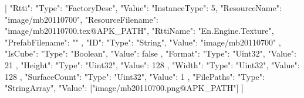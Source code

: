 [{
        "Rtti": {
            "Type": "FactoryDesc",
            "Value": {
                "InstanceType": 5,
                "ResourceName": "image/mb20110700",
                "ResourceFilename": "image/mb20110700.tex@APK_PATH",
                "RttiName": "En.Engine.Texture",
                "PrefabFilename": ""
            }
        },
        "ID": {
            "Type": "String",
            "Value": "image/mb20110700"
        },
        "IsCube": {
            "Type": "Boolean",
            "Value": false
        },
        "Format": {
            "Type": "Uint32",
            "Value": 21
        },
        "Height": {
            "Type": "Uint32",
            "Value": 128
        },
        "Width": {
            "Type": "Uint32",
            "Value": 128
        },
        "SurfaceCount": {
            "Type": "Uint32",
            "Value": 1
        },
        "FilePaths": {
            "Type": "StringArray",
            "Value": ["image/mb20110700.png@APK_PATH"]
        }
    }]